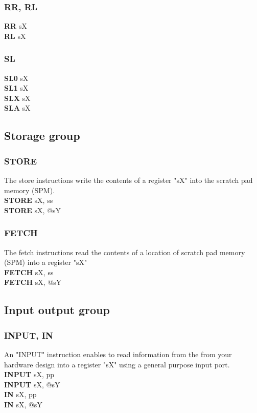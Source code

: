             \subsubsection{RR, RL}
                \textbf{RR}  sX\\
                \textbf{RL}  sX\\

            \subsubsection{SL}
                \textbf{SL0} sX\\
                \textbf{SL1} sX\\
                \textbf{SLX} sX\\
                \textbf{SLA} sX\\

        \subsection{Storage group}
            \subsubsection{STORE}
                The store instructions write the contents of a register "sX" into the scratch pad memory (SPM).\\
                \textbf{STORE} sX, ss\\
                \textbf{STORE} sX, @sY\\

            \subsubsection{FETCH}
                The fetch instructions read the contents of a location of scratch pad memory (SPM) into a register "sX"\\
                \textbf{FETCH} sX, ss\\
                \textbf{FETCH} sX, @sY\\

        \subsection{Input output group}
            \subsubsection{INPUT, IN}
                An "INPUT" instruction enables to read information from the from your hardware design into a register "sX" using a general purpose input port.\\
                \textbf{INPUT}      sX, pp\\
                \textbf{INPUT}      sX, @sY\\
                \textbf{IN}         sX, pp\\
                \textbf{IN}         sX, @sY\\

